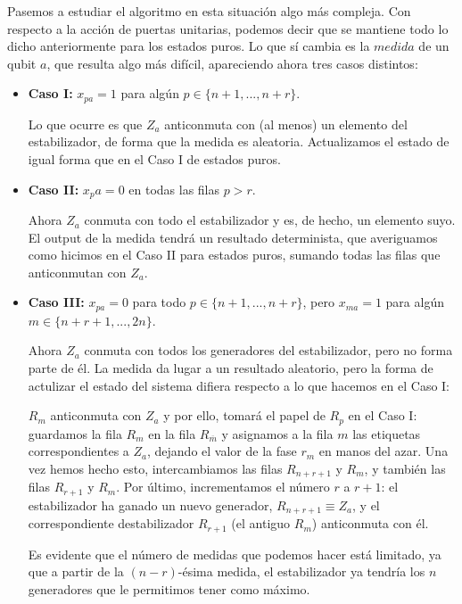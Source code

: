 \documentclass[11pt,a4paper,twoside,pdf]{article}
\numberwithin{equation}{section}
\begin{document}
		Pasemos a estudiar el algoritmo en esta situación algo más compleja. Con respecto a la acción de puertas unitarias, podemos decir que se mantiene todo lo dicho anteriormente para los estados puros. Lo que sí cambia es la $medida$ de un qubit $a$, que resulta algo más difícil, apareciendo ahora tres casos distintos:
		
			\begin{itemize}
				
				\item[] \textbf{Caso I: } $x_{pa}=1$ para algún $p \in \{n+1,...,n+r\}$. 
				
					Lo que ocurre es que $Z_a$ anticonmuta con (al menos) un elemento del estabilizador, de forma que la medida es aleatoria. Actualizamos el estado de igual forma que en el Caso I de estados puros.
					
				\item[] \textbf{Caso II: } $x_pa=0$ en todas las filas $p>r$.
				
					Ahora $Z_a$ conmuta con todo el estabilizador y es, de hecho, un elemento suyo. El output de la medida tendrá un resultado determinista, que averiguamos como hicimos en el Caso II para estados puros, sumando todas las filas que anticonmutan con $Z_a$.
					
				\item[] \textbf{Caso III: } $x_{pa}=0$ para todo $p\in \{n+1,...,n+r\}$, pero $x_{ma}=1$ para algún $m\in \{n+r+1,...,2n\}$. 
				
					Ahora $Z_a$ conmuta con todos los generadores del estabilizador, pero no forma parte de él. La medida da lugar a un resultado aleatorio, pero la forma de actulizar el estado del sistema difiera respecto a lo que hacemos en el Caso I:
					
					$R_m$ anticonmuta con $Z_a$ y por ello, tomará el papel de $R_p$ en el Caso I: guardamos la fila $R_m$ en la fila $R_{\overline{m}}$ y asignamos a la fila $m$ las etiquetas correspondientes a $Z_a$, dejando el valor de la fase $r_m$ en manos del azar. Una vez hemos hecho esto, intercambiamos las filas $R_{n+r+1}$ y $R_m$, y también las filas $R_{r+1}$ y $R_m$. Por último, incrementamos el número $r$ a $r+1$: el estabilizador ha ganado un nuevo generador, $R_{n+r+1} \equiv Z_a$, y el correspondiente destabilizador $R_{r+1}$ (el antiguo $R_m$) anticonmuta con él.
					
					Es evidente que el número de medidas que podemos hacer está limitado, ya que a partir de la $(n-r)$-ésima medida, el estabilizador ya tendría los $n$ generadores que le permitimos tener como máximo.
			\end{itemize}
		
\end{document}
